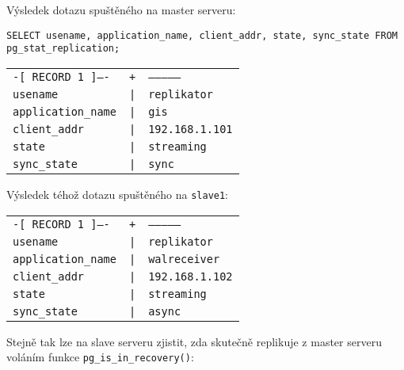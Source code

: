 Výsledek dotazu spuštěného na master serveru:

\begin{lstlisting}
SELECT usename, application_name, client_addr, state, sync_state FROM pg_stat_replication;
\end{lstlisting}

\begin{table}[H]
  \label{pgHba}
  \begin{center}
    \begin{tabular}{lll}
      \texttt{-[ RECORD 1 ]----} & \texttt{+} & \texttt{--------------}\\
      \texttt{usename}           & \texttt{|} & \texttt{replikator}\\
      \texttt{application\_name} & \texttt{|} & \texttt{gis}\\
      \texttt{client\_addr}      & \texttt{|} & \texttt{192.168.1.101}\\
      \texttt{state}             & \texttt{|} & \texttt{streaming}\\
      \texttt{sync\_state}       & \texttt{|} & \texttt{sync}\\
    \end{tabular}
  \end{center}
\end{table}

Výsledek téhož dotazu spuštěného na \texttt{slave1}:

\begin{table}[H]
  \label{pgHba}
  \begin{center}
    \begin{tabular}{lll}
      \texttt{-[ RECORD 1 ]----} & \texttt{+} & \texttt{--------------}\\
      \texttt{usename}           & \texttt{|} & \texttt{replikator}\\
      \texttt{application\_name} & \texttt{|} & \texttt{walreceiver}\\
      \texttt{client\_addr}      & \texttt{|} & \texttt{192.168.1.102}\\
      \texttt{state}             & \texttt{|} & \texttt{streaming}\\
      \texttt{sync\_state}       & \texttt{|} & \texttt{async}\\
    \end{tabular}
  \end{center}
\end{table}
Stejně tak lze na slave serveru zjistit, zda skutečně replikuje z master serveru
voláním funkce \texttt{pg\_is\_in\_recovery()}:

